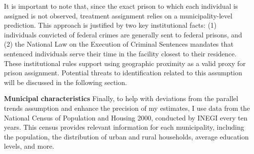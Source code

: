 It is important to note that, since the exact prison to which each individual is assigned is not observed, treatment assignment relies on a municipality-level prediction. This approach is justified by two key institutional facts: (1) individuals convicted of federal crimes are generally sent to federal prisons, and (2) the National Law on the Execution of Criminal Sentences mandates that sentenced individuals serve their time in the facility closest to their residence. These institutional rules support using geographic proximity as a valid proxy for prison assignment. Potential threats to identification related to this assumption will be discussed in the following section.

\textbf{Municipal characteristics}  Finally, to help with deviations from the parallel trends assumption and enhance the precision of my estimates, I use data from the National Census of Population and Housing 2000, conducted by INEGI every ten years. This census provides relevant information for each municipality, including the population, the distribution of urban and rural households, average education levels, and more.

